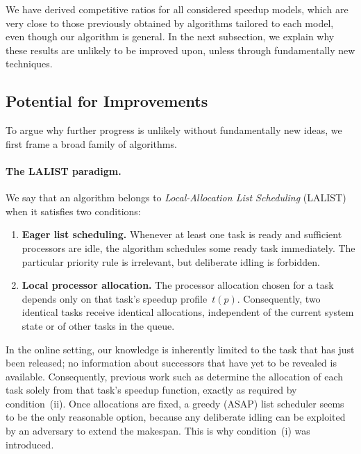\documentclass{article}
\begin{document}
We have derived competitive ratios for all considered speedup models, which are very close to those previously obtained by algorithms tailored to each model, even though our algorithm is general. In the next subsection, we explain why these results are unlikely to be improved upon, unless through fundamentally new techniques.

\subsection{Potential for Improvements}


To argue why further progress is unlikely without fundamentally new ideas, we first frame a broad family of algorithms.

\paragraph{The \textsc{LALIST} paradigm.}
We say that an algorithm belongs to \emph{Local-Allocation List Scheduling} (\textsc{LALIST}) when it satisfies two conditions:
\begin{enumerate}[label=(\roman*)]
    \item \textbf{Eager list scheduling.}  
          Whenever at least one task is ready and sufficient processors are idle, the algorithm schedules some ready task immediately.  The particular priority rule is irrelevant, but deliberate idling is forbidden.
    \item \textbf{Local processor allocation.}  
          The processor allocation chosen for a task depends only on that task’s speedup profile~$t(p)$.  Consequently, two identical tasks receive identical allocations, independent of the current system state or of other tasks in the queue.
\end{enumerate}

In the online setting, our knowledge is inherently limited to the task that has
just been released; no information about successors that have yet to be revealed is available.
Consequently, previous work such as \cite{ICPP22,TOPC24} determine the
allocation of each task solely from that task’s speedup function, exactly as
required by condition~(ii).
Once allocations are fixed, a greedy (ASAP) list scheduler seems to be the only
reasonable option, because any deliberate idling can be exploited by an
adversary to extend the makespan. This is why condition~(i) was introduced.
\end{document}
